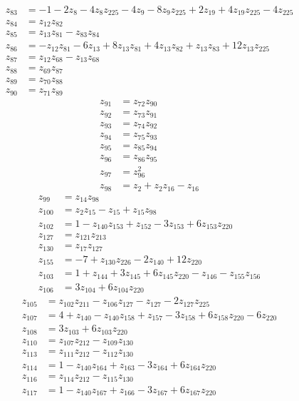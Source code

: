 \begin{align*}
z_{83}&=-1-2z_{8}-4z_{8} z_{225}-4z_{9}-8z_{9} z_{225}+2z_{19}+4z_{19} z_{225}-4z_{225}\\[3pt]
z_{84}&=z_{12} z_{82}\\[3pt]
z_{85}&=z_{13} z_{81}-z_{83} z_{84}\\[3pt]
z_{86}&=-z_{12} z_{81}-6z_{13}+8z_{13} z_{81}+4z_{13} z_{82}+z_{13} z_{83}+12z_{13} z_{225}\\[3pt]
z_{87}&=z_{12} z_{68}-z_{13} z_{68}\\[3pt]
z_{88}&=z_{69} z_{87}\\[3pt]
z_{89}&=z_{70} z_{88}\\[3pt]
z_{90}&=z_{71} z_{89}
\end{align*}
\begin{align*}
z_{91}&=z_{72} z_{90}\\[3pt]
z_{92}&=z_{73} z_{91}\\[3pt]
z_{93}&=z_{74} z_{92}\\[3pt]
z_{94}&=z_{75} z_{93}\\[3pt]
z_{95}&=z_{85} z_{94}\\[3pt]
z_{96}&=z_{86} z_{95}\\[3pt]
z_{97}&=z_{96}^{2}\\[3pt]
z_{98}&=z_{2}+z_{2} z_{16}-z_{16}
\end{align*}
\begin{align*}
z_{99}&=z_{14} z_{98}\\[3pt]
z_{100}&=z_{2} z_{15}-z_{15}+z_{15} z_{98}\\[3pt]
z_{102}&=1-z_{140} z_{153}+z_{152}-3z_{153}+6z_{153} z_{220}\\[3pt]
z_{127}&=z_{121} z_{213}\\[3pt]
z_{130}&=z_{17} z_{127}\\[3pt]
z_{155}&=-7+z_{130} z_{226}-2z_{140}+12z_{220}\\[3pt]
z_{103}&=1+z_{144}+3z_{145}+6z_{145} z_{220}-z_{146}-z_{155} z_{156}\\[3pt]
z_{106}&=3z_{104}+6z_{104} z_{220}
\end{align*}
\begin{align*}
z_{105}&=z_{102} z_{211}-z_{106} z_{127}-z_{127}-2z_{127} z_{225}\\[3pt]
z_{107}&=4+z_{140}-z_{140} z_{158}+z_{157}-3z_{158}+6z_{158} z_{220}-6z_{220}\\[3pt]
z_{108}&=3z_{103}+6z_{103} z_{220}\\[3pt]
z_{110}&=z_{107} z_{212}-z_{109} z_{130}\\[3pt]
z_{113}&=z_{111} z_{212}-z_{112} z_{130}\\[3pt]
z_{114}&=1-z_{140} z_{164}+z_{163}-3z_{164}+6z_{164} z_{220}\\[3pt]
z_{116}&=z_{114} z_{212}-z_{115} z_{130}\\[3pt]
z_{117}&=1-z_{140} z_{167}+z_{166}-3z_{167}+6z_{167} z_{220}
\end{align*}
